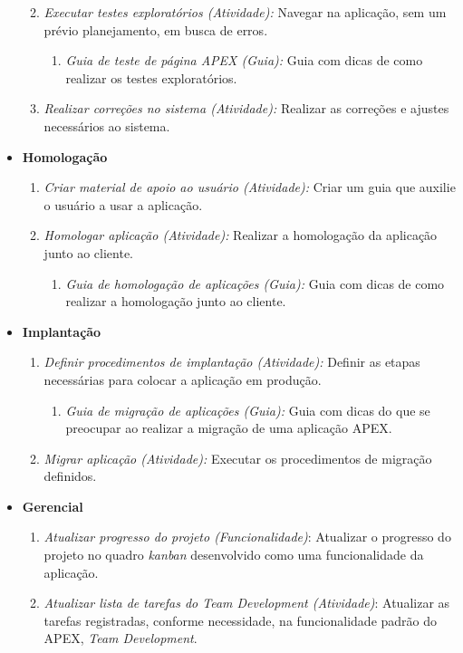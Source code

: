 \begin{itemize}
\begin{enumerate}
\begin{enumerate}
\end{enumerate}
\item \textit{Executar testes exploratórios (Atividade):} Navegar na aplicação, sem um prévio planejamento, em busca de erros.
\begin{enumerate}
\item \textit{Guia de teste de página APEX (Guia):} Guia com dicas de como realizar os testes exploratórios.
\end{enumerate}
\item \textit{Realizar correções no sistema (Atividade):} Realizar as correções e ajustes necessários ao sistema.
\end{enumerate}
\item \textbf{Homologação}
\begin{enumerate}
\item \textit{Criar material de apoio ao usuário (Atividade):} Criar um guia que auxilie o usuário a usar a aplicação.
\item \textit{Homologar aplicação (Atividade):} Realizar a homologação da aplicação junto ao cliente.
\begin{enumerate}
\item \textit{Guia de homologação de aplicações (Guia):} Guia com dicas de como realizar a homologação junto ao cliente.
\end{enumerate}
\end{enumerate}
\item \textbf{Implantação}
\begin{enumerate}
\item \textit{Definir procedimentos de implantação (Atividade):} Definir as etapas necessárias para colocar a aplicação em produção.
\begin{enumerate}
\item \textit{Guia de migração de aplicações (Guia):} Guia com dicas do que se preocupar ao realizar a migração de uma aplicação APEX.
\end{enumerate}
\item \textit{Migrar aplicação (Atividade):} Executar os procedimentos de migração definidos.
\end{enumerate}
\clearpage
\item \textbf{Gerencial}
\begin{enumerate}
\item \textit{Atualizar progresso do projeto (Funcionalidade)}: Atualizar o progresso do projeto no quadro \textit{kanban} desenvolvido como uma funcionalidade da aplicação.
\item \textit{Atualizar lista de tarefas do Team Development (Atividade)}: Atualizar as tarefas registradas, conforme necessidade, na funcionalidade padrão do APEX, \textit{Team Development}.
\end{enumerate}
\end{itemize}


